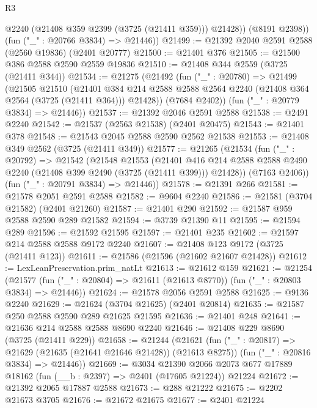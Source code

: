 \begin{lexlean}{R3}
\begin{coremodule}
            @2240
            (@21408 @359 @2399 (@3725 (@21411 @359)))
            @21428))
        (@8191 @2398))
      (fun ("_" : @20766 @3834) => @21446))
@21499 := @21392 @2040 @2591 @2588 (@2560 @19836) (@2401 @20777)
@21500 := @21401 @376
@21505 := @21500 @386 @2588 @2590 @2559 @19836
@21510 := @21408 @344 @2559 (@3725 (@21411 @344))
@21534 := @21275
    (@21492
      (fun ("_" : @20780) =>
      @21499
        (@21505
          @21510
          (@21401
            @384
            @214
            @2588
            @2588
            @2564
            @2240
            (@21408 @364 @2564 (@3725 (@21411 @364)))
            @21428))
        (@7684 @2402))
      (fun ("_" : @20779 @3834) => @21446))
@21537 := @21392 @2046 @2591 @2588
@21538 := @2491 @2240
@21542 := @21537 (@2563 @21538) (@2401 @20475)
@21543 := @21401 @378
@21548 := @21543 @2045 @2588 @2590 @2562 @21538
@21553 := @21408 @349 @2562 (@3725 (@21411 @349))
@21577 := @21265
    (@21534
      (fun ("_" : @20792) =>
      @21542
        (@21548
          @21553
          (@21401
            @416
            @214
            @2588
            @2588
            @2490
            @2240
            (@21408 @399 @2490 (@3725 (@21411 @399)))
            @21428))
        (@7163 @2406))
      (fun ("_" : @20791 @3834) => @21446))
@21578 := @21391 @266
@21581 := @21578 @2051 @2591 @2588
@21582 := @9604 @2240
@21586 := @21581 (@3704 @21582) (@2401 @21260)
@21587 := @21401 @290
@21592 := @21587 @959 @2588 @2590 @289 @21582
@21594 := @3739 @21390 @11
@21595 := @21594 @289
@21596 := @21592 @21595
@21597 := @21401 @235
@21602 := @21597 @214 @2588 @2588 @9172 @2240
@21607 := @21408 @123 @9172 (@3725 (@21411 @123))
@21611 := @21586 (@21596 (@21602 @21607 @21428))
@21612 := LexLeanPreservation.prim_natLt
@21613 := @21612 @159
@21621 := @21254
    (@21577 (fun ("_" : @20804) => @21611 (@21613 @8770)) (fun ("_" : @20803 @3834) => @21446))
@21624 := @21578 @2056 @2591 @2588
@21625 := @9136 @2240
@21629 := @21624 (@3704 @21625) (@2401 @20814)
@21635 := @21587 @250 @2588 @2590 @289 @21625 @21595
@21636 := @21401 @248
@21641 := @21636 @214 @2588 @2588 @8690 @2240
@21646 := @21408 @229 @8690 (@3725 (@21411 @229))
@21658 := @21244
    (@21621
      (fun ("_" : @20817) => @21629 (@21635 (@21641 @21646 @21428)) (@21613 @8275))
      (fun ("_" : @20816 @3834) => @21446))
@21669 := @3034
    @21390
    @2066
    @2073
    @677
    @17889
    @18162
    (fun (__b : @2397) => @2401 (@17605 @21224))
    @21224
@21672 := @21392 @2065 @17887 @2588
@21673 := @288 @21222
@21675 := @2202 @21673 @3705
@21676 := @21672 @21675
@21677 := @2401 @21224

\end{coremodule}
\end{lexlean}
